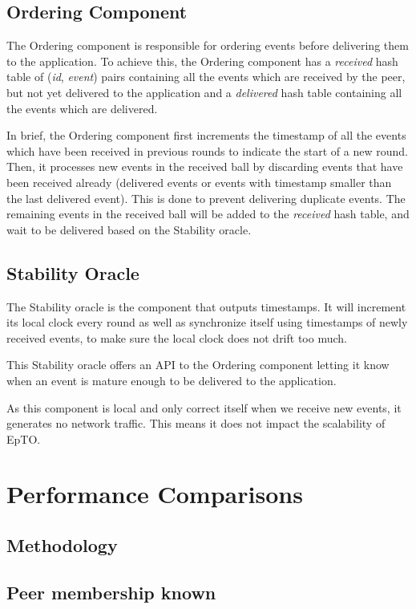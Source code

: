 \documentclass[10pt,conference,a4paper]{IEEEtran}
\begin{document}
\subsection{Ordering Component}
The Ordering component is responsible for ordering events before delivering them to the application.
To achieve this, the Ordering component has a \textit{received} hash table of (\textit{id}, \textit{event}) pairs containing all the events which are received by the peer, but not yet delivered to the application and a \textit{delivered} hash table containing all the events which are delivered.
\par
In brief, the Ordering component first increments the timestamp of all the events which have been received in previous rounds to indicate the start of a new round. Then, it processes new events in the received ball by discarding events that have been received already (delivered events or events with timestamp smaller than the last delivered event). This is done to prevent delivering duplicate events. The remaining events in the received ball will be added to the \textit{received} hash table, and wait to be delivered based on the Stability oracle.
\subsection{Stability Oracle}
The Stability oracle is the component that outputs timestamps. It will increment its local clock every round as well as synchronize itself using timestamps of newly received events, to make sure the local clock does not drift too much.
\par
This Stability oracle offers an API to the Ordering component letting it know when an event is mature enough to be delivered to the application.
\par
As this component is local and only correct itself when we receive new events, it generates no network traffic. This means it does not impact the scalability of EpTO.
\section{Performance Comparisons}
\subsection{Methodology}
\subsection{Peer membership known}
\end{document}
